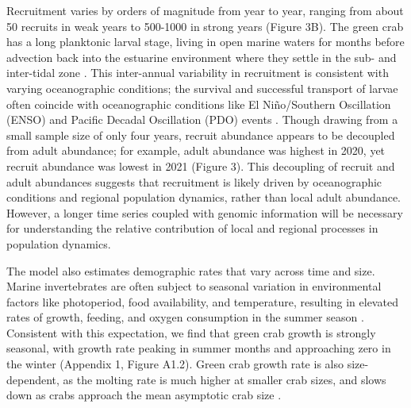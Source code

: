 \documentclass{article}
\begin{document}
Recruitment varies by orders of magnitude from year to year, ranging from about 50 recruits in weak years to 500-1000 in strong years (Figure 3B). The green crab has a long planktonic larval stage, living in open marine waters for months before advection back into the estuarine environment where they settle in the sub- and inter-tidal zone \parencite{yamada2001global}. This inter-annual variability in recruitment is consistent with varying oceanographic conditions; the survival and successful transport of larvae often coincide with oceanographic conditions like El Niño/Southern Oscillation (ENSO) and Pacific Decadal Oscillation (PDO) events \parencite{yamada2021ocean}. Though drawing from a small sample size of only four years, recruit abundance appears to be decoupled from adult abundance; for example, adult abundance was highest in 2020, yet recruit abundance was lowest in 2021 (Figure 3). This decoupling of recruit and adult abundances suggests that recruitment is likely driven by oceanographic conditions and regional population dynamics, rather than local adult abundance. However, a longer time series coupled with genomic information will be necessary for understanding the relative contribution of local and regional processes in population dynamics.

The model also estimates demographic rates that vary across time and size. Marine invertebrates are often subject to seasonal variation in environmental factors like photoperiod, food availability, and temperature, resulting in elevated rates of growth, feeding, and oxygen consumption in the summer season \parencite{brockington2001relative}. Consistent with this expectation, we find that green crab growth is strongly seasonal, with growth rate peaking in summer months and approaching zero in the winter (Appendix 1, Figure A1.2). Green crab growth rate is also size-dependent, as the molting rate is much higher at smaller crab sizes, and slows down as crabs approach the mean asymptotic crab size \parencite{yamada2005growth}.
\end{document}
